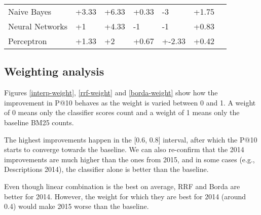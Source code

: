 \begin{table}[h]
{\begin{tabular}{@{}lllllll@{}}
Naive Bayes                                              & +3.33           & +6.33              & +0.33           & -3                & +1.75          \\
Neural Networks                                         & +1              & +4.33              & -1             & -1                & +0.83          \\
Perceptron                                              & +1.33           & +2                 & +0.67           & +-2.33             & +0.42         \\\bottomrule
\end{tabular}%
}
\end{table}

\subsection{Weighting analysis}

Figures \ref{interp-weight}, \ref{rrf-weight} and \ref{borda-weight} show how the improvement in P@10 behaves as the
weight is varied between 0 and 1. A weight of 0 means only the classifier scores count and a weight of 1 means
only the baseline BM25 counts.

The highest improvements happen in the [0.6, 0.8] interval, after which the P@10 starts to converge towards the baseline.
We can also re-confirm that the 2014 improvements are much higher than the ones from 2015, and in some cases (e.g., Descriptions
2014), the classifier alone is better than the baseline.

Even though linear combination is the best on average, RRF and Borda are better for 2014. However, the weight for which they are
best for 2014 (around 0.4) would make 2015 worse than the baseline.

% 
% 

